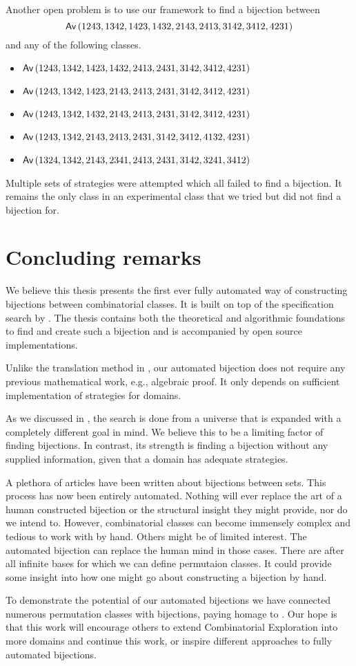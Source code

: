 Another open problem is to use our framework to find a bijection between
\[
\textsf{Av}\left(1243,1342,1423,1432,2143,2413,3142,3412,4231\right)
\]
and any of the following classes.
\begin{itemize}
\item $\textsf{Av}\left(1243,1342,1423,1432,2413,2431,3142,3412,4231\right)$
\item $\textsf{Av}\left(1243,1342,1423,2143,2413,2431,3142,3412,4231\right)$
\item $\textsf{Av}\left(1243,1342,1432,2143,2413,2431,3142,3412,4231\right)$
\item $\textsf{Av}\left(1243,1342,2143,2413,2431,3142,3412,4132,4231\right)$
\item $\textsf{Av}\left(1324,1342,2143,2341,2413,2431,3142,3241,3412\right)$
\end{itemize}
Multiple sets of strategies were attempted which all failed to find a bijection. It remains the only class in an experimental class that we tried but did not find a bijection for.


\section{Concluding remarks}
We believe this thesis presents the first ever fully automated way of constructing bijections between combinatorial classes. It is built on top of the specification search by . The thesis contains both the theoretical and algorithmic foundations to find and create such a bijection and is accompanied by open source implementations.

Unlike the translation method in , our automated bijection does not require any previous mathematical work, e.g., algebraic proof. It only depends on sufficient implementation of strategies for domains.

As we discussed in , the search is done from a universe that is expanded with a completely different goal in mind. We believe this to be a limiting factor of finding bijections. In contrast, its strength is finding a bijection without any supplied information, given that a domain has adequate strategies.

A plethora of articles have been written about bijections between sets. This process has now been entirely automated. Nothing will ever replace the art of a human constructed bijection or the structural insight they might provide, nor do we intend to. However, combinatorial classes can become immensely complex and tedious to work with by hand. Others might be of limited interest. The automated bijection can replace the human mind in those cases. There are after all infinite bases for which we can define permutaion classes. It could provide some insight into how one might go about constructing a bijection by hand.

To demonstrate the potential of our automated bijections we have connected numerous permutation classes with bijections, paying homage to . Our hope is that this work will encourage others to extend Combinatorial Exploration into more domains and continue this work, or inspire different approaches to fully automated bijections.